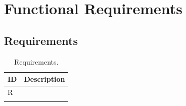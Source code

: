 \section{Functional Requirements}
\label{sec:functional_requirements}%

\subsection{Requirements}
\label{subsec: requirements}%
\setcounter{req}{1}
\newcommand{\creq}{\thereq\stepcounter{req}}
\begin{center}
    \begin{longtable}{|l|l|}
        \hline
        \textbf{ID} & \textbf{Description} \\
        \hline
        R\creq      &                      \\
        \hline
        \caption{Requirements.}
        \label{tab: req}%
    \end{longtable}
\end{center}

